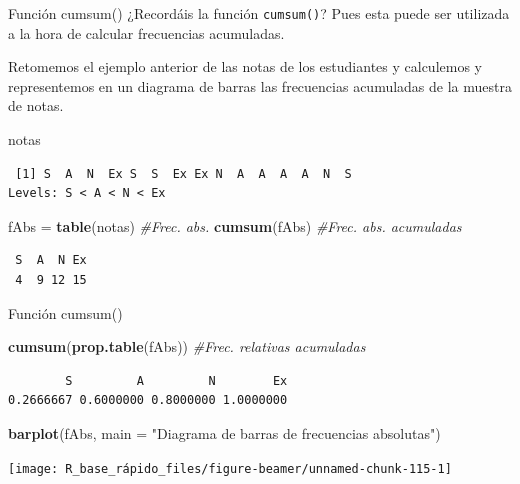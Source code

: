 \documentclass[
  ignorenonframetext,
  aspectratio=169]{beamer}
\newenvironment{Shaded}{\begin{snugshade}}{\end{snugshade}}
\newcommand{\AttributeTok}[1]{\textcolor[rgb]{0.13,0.29,0.53}{#1}}
\newcommand{\CommentTok}[1]{\textcolor[rgb]{0.56,0.35,0.01}{\textit{#1}}}
\newcommand{\FunctionTok}[1]{\textcolor[rgb]{0.13,0.29,0.53}{\textbf{#1}}}
\newcommand{\NormalTok}[1]{#1}
\newcommand{\OtherTok}[1]{\textcolor[rgb]{0.56,0.35,0.01}{#1}}
\newcommand{\StringTok}[1]{\textcolor[rgb]{0.31,0.60,0.02}{#1}}
\begin{document}
\begin{frame}[fragile]{Función cumsum()}
\label{funciuxf3n-cumsum}
¿Recordáis la función \texttt{cumsum()}? Pues esta puede ser utilizada a
la hora de calcular frecuencias acumuladas.

Retomemos el ejemplo anterior de las notas de los estudiantes y
calculemos y representemos en un diagrama de barras las frecuencias
acumuladas de la muestra de notas.

\begin{Shaded}
\begin{Highlighting}[]
\NormalTok{notas}
\end{Highlighting}
\end{Shaded}

\begin{verbatim}
 [1] S  A  N  Ex S  S  Ex Ex N  A  A  A  A  N  S 
Levels: S < A < N < Ex
\end{verbatim}

\begin{Shaded}
\begin{Highlighting}[]
\NormalTok{fAbs }\OtherTok{=} \FunctionTok{table}\NormalTok{(notas) }\CommentTok{\#Frec. abs.}
\FunctionTok{cumsum}\NormalTok{(fAbs) }\CommentTok{\#Frec. abs. acumuladas}
\end{Highlighting}
\end{Shaded}

\begin{verbatim}
 S  A  N Ex 
 4  9 12 15 
\end{verbatim}
\end{frame}

\begin{frame}[fragile]{Función cumsum()}
\label{funciuxf3n-cumsum-1}
\begin{Shaded}
\begin{Highlighting}[]
\FunctionTok{cumsum}\NormalTok{(}\FunctionTok{prop.table}\NormalTok{(fAbs)) }\CommentTok{\#Frec. relativas acumuladas}
\end{Highlighting}
\end{Shaded}

\begin{verbatim}
        S         A         N        Ex 
0.2666667 0.6000000 0.8000000 1.0000000 
\end{verbatim}

\begin{Shaded}
\begin{Highlighting}[]
\FunctionTok{barplot}\NormalTok{(fAbs, }\AttributeTok{main =} \StringTok{"Diagrama de barras de frecuencias absolutas"}\NormalTok{)}
\end{Highlighting}
\end{Shaded}

\begin{center}\texttt{[image: R\_base\_rápido\_files/figure-beamer/unnamed-chunk-115-1]} \end{center}
\end{frame}
\end{document}
